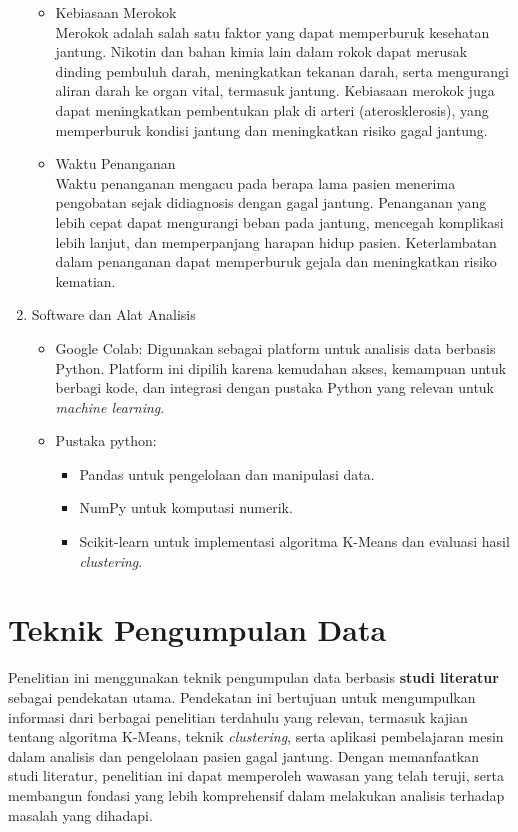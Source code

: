 \documentclass[english,12pt,a4paper,openany]{book}
\begin{document}
\begin{enumerate}
\begin{itemize}
			\item Kebiasaan Merokok\\
			Merokok adalah salah satu faktor yang dapat memperburuk kesehatan jantung. Nikotin dan bahan kimia lain dalam rokok dapat merusak dinding pembuluh darah, meningkatkan tekanan darah, serta mengurangi aliran darah ke organ vital, termasuk jantung. Kebiasaan merokok juga dapat meningkatkan pembentukan plak di arteri (aterosklerosis), yang memperburuk kondisi jantung dan meningkatkan risiko gagal jantung.
			
			\item Waktu Penanganan\\
			Waktu penanganan mengacu pada berapa lama pasien menerima pengobatan sejak didiagnosis dengan gagal jantung. Penanganan yang lebih cepat dapat mengurangi beban pada jantung, mencegah komplikasi lebih lanjut, dan memperpanjang harapan hidup pasien. Keterlambatan dalam penanganan dapat memperburuk gejala dan meningkatkan risiko kematian.
			
		\end{itemize}
		\item Software dan Alat Analisis
		\begin{itemize}
			\item Google Colab: Digunakan sebagai platform untuk analisis data berbasis Python. Platform ini dipilih karena kemudahan akses, kemampuan untuk berbagi kode, dan integrasi dengan pustaka Python yang relevan untuk \textit{machine learning}.
			\item Pustaka python: 
			\begin{itemize}
				\item Pandas untuk pengelolaan dan manipulasi data.
				\item NumPy untuk komputasi numerik.
				\item Scikit-learn untuk implementasi algoritma K-Means dan evaluasi hasil \textit{clustering}.
			\end{itemize}
		\end{itemize}
	\end{enumerate}
	\section{Teknik Pengumpulan Data}
	
	Penelitian ini menggunakan teknik pengumpulan data berbasis \textbf{studi literatur} sebagai pendekatan utama. Pendekatan ini bertujuan untuk mengumpulkan informasi dari berbagai penelitian terdahulu yang relevan, termasuk kajian tentang algoritma K-Means, teknik \textit{clustering}, serta aplikasi pembelajaran mesin dalam analisis dan pengelolaan pasien gagal jantung. Dengan memanfaatkan studi literatur, penelitian ini dapat memperoleh wawasan yang telah teruji, serta membangun fondasi yang lebih komprehensif dalam melakukan analisis terhadap masalah yang dihadapi.
	
\end{document}
